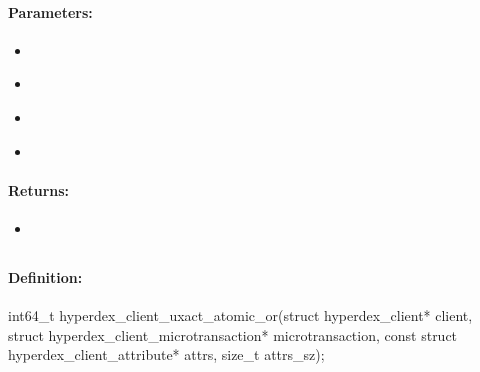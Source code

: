 \paragraph{Parameters:}
\begin{itemize}[noitemsep]
\item {}\\

\item {}\\

\item {}\\

\item {}\\

\end{itemize}

\paragraph{Returns:}
\begin{itemize}[noitemsep]
\item {}\\

\end{itemize}

\pagebreak
\subsection{}
\label{api:c:uxact_atomic_or}


\paragraph{Definition:}
\begin{ccode}
int64_t hyperdex_client_uxact_atomic_or(struct hyperdex_client* client,
        struct hyperdex_client_microtransaction* microtransaction,
        const struct hyperdex_client_attribute* attrs, size_t attrs_sz);
\end{ccode}

